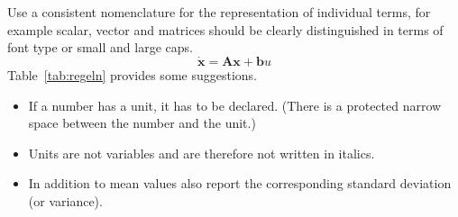 %
Use a consistent nomenclature for the representation of individual terms, for example scalar, vector and matrices should be clearly distinguished in terms of font type or small and large caps.
%
\begin{equation}
  \dot{\mathbf{x}} = \mathbf{A} \mathbf{x} + \mathbf{b} u
  \label{equ:beispiel2}
\end{equation}
%
Table~\ref{tab:regeln} provides some suggestions.

\begin{itemize}
  \item If a number has a unit, it has to be declared. (There is a protected narrow space between the number and the unit.)
  \item Units are not variables and are therefore not written in italics.
  \item In addition to  mean values also report the corresponding standard deviation (or variance).
\end{itemize}

